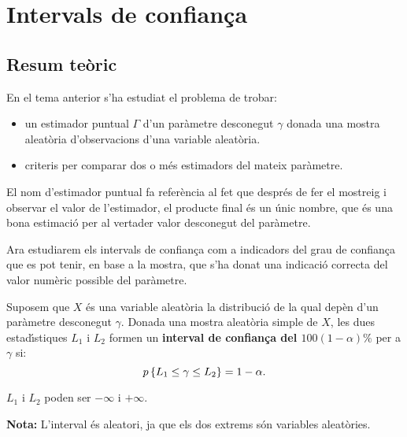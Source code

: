 \chapter{Intervals de confian\c{c}a}

\section{Resum te\`oric}

En el tema anterior s'ha estudiat el problema de trobar:
\begin{itemize}
\item un estimador puntual
 $\Gamma$ d'un par\`ametre
 desconegut $\gamma$ donada una
mostra aleat\`oria d'observacions d'una variable aleat\`oria.

\item criteris per comparar dos o m\'es estimadors
 del mateix par\`ametre.
\end{itemize}

El nom d'estimador puntual fa refer\`encia al fet que despr\'es de fer el mostreig i
observar el valor de l'estimador, el producte final 
\'es un \'unic nombre, que \'es una bona estimaci\'o
 per al vertader valor desconegut del par\`ametre.

Ara estudiarem els intervals de confian\c{c}a
 com a indicadors del 
grau de confian\c ca 
que es pot tenir, 
en base a la mostra, 
que s'ha donat una indicaci\'o correcta del valor num\`eric possible del par\`ametre.

\begin{defin}
Suposem que $X$ \'es una variable aleat\`oria la distribuci\'o 
de la qual dep\`en d'un par\`ametre 
desconegut $\gamma$. Donada una mostra aleat\`oria simple de $X$, 
les dues estad\'{\i}stiques $L_1$ i $L_2$ formen un 
{\bf interval de confian\c ca del $100(1-\alpha)\%$} per a $\gamma$ si:
$$p\left\{L_1 \leq \gamma \leq L_2\right\} = 1 - \alpha.$$

$L_1$ i $L_2$ poden ser $-\infty$ i $+\infty$.
\end{defin}

{\bf Nota:} L'interval \'es aleatori, ja que els dos extrems s\'on variables
aleat\`ories.


